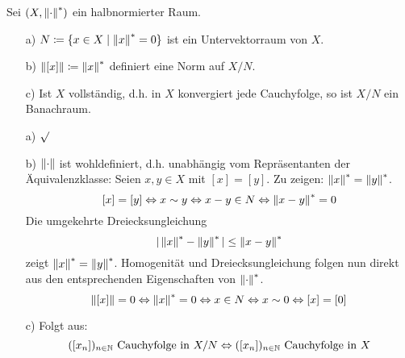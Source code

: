 \begin{satz}
Sei $ (X,\left\|\cdot\right\|^\ast) $ ein halbnormierter Raum.
\begin{enumerate}
\item[a)] $ N\coloneqq\lbrace x\in X\mid \left\|x\right\|^\ast=0\rbrace $ ist ein Untervektorraum von $ X $.
\item[b)] $ \left\|[x]\right\|\coloneqq\left\|x\right\|^\ast $ definiert eine Norm auf $ X/N $.
\item[c)] Ist $ X $ vollst\"andig, d.h. in $ X $ konvergiert jede Cauchyfolge, so ist $ X/N $ ein Banachraum.
\end{enumerate}
\end{satz}
\begin{beweis}
\begin{enumerate}
\item[a)] $ \surd $
\item[b)] $ \left\|\cdot\right\| $ ist wohldefiniert, d.h. unabh\"angig vom Repr\"asentanten der \"Aquivalenzklasse: Seien $ x,y\in X $ mit $ [x]=[y] $. Zu zeigen: $ \left\|x\right\|^\ast=\left\|y\right\|^\ast $.
\[ [x]=[y]\Leftrightarrow x\sim y\Leftrightarrow x-y\in N\Leftrightarrow\left\|x-y\right\|^\ast=0 \]
Die umgekehrte Dreiecksungleichung \[ |\left\|x\right\|^\ast-\left\|y\right\|^\ast|\leq\left\|x-y\right\|^\ast \] zeigt $ \left\|x\right\|^\ast=\left\|y\right\|^\ast $. Homogenit\"at und Dreiecksungleichung folgen nun direkt aus den entsprechenden Eigenschaften von $ \left\|\cdot\right\|^\ast $.
\[ \left\|[x]\right\|=0\Leftrightarrow\left\|x\right\|^\ast=0\Leftrightarrow x\in N\Leftrightarrow x\sim 0\Leftrightarrow[x]=[0] \]
\item[c)] Folgt aus: 
\[ ([x_n])_{n\in\mathbb{N}}\text{ Cauchyfolge in }X/N\Leftrightarrow([x_n])_{n\in\mathbb{N}}\text{ Cauchyfolge in }X \]
\end{enumerate}
\end{beweis}
